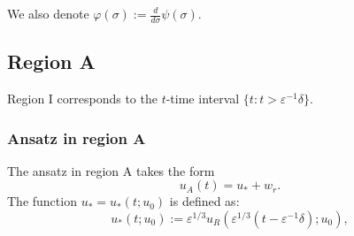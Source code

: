 \documentclass[letterpaper,11pt]{article}
\newcommand{\rmO}{\mathcal{O}}
\newcommand{\eps}{\varepsilon}
\numberwithin{equation}{section}
\theoremstyle{plain}
\begin{document}
We also denote $\varphi(\sigma) := \frac{d}{d\sigma}\psi(\sigma)$.


\iffalse
\begin{equation*}
\varphi(\sigma) =\begin{cases}
 (-\frac{3}{2}\sigma)^{-1/3}, \text{ as }\sigma \to -\infty\\
e^{-\sigma} , \text{ as }\sigma \to \infty.
\end{cases}
\end{equation*}

\begin{equation*}
u_R(\psi(\sigma)) \to \begin{cases}
 -(-\frac{3}{2}\sigma)^{1/3}, \text{ as }\sigma \to -\infty\\
e^{\sigma} , \text{ as }\sigma \to \infty.
\end{cases}
\end{equation*}

\begin{equation*}
2u_R\varphi(\sigma) \to\begin{cases}
-2+ \rmO((-\sigma)^{-3/2}), \text{ as }\sigma \to -\infty\\
2+ \rmO(e^{-2\sigma}), \text{ as }\sigma \to \infty.
\end{cases}
\end{equation*}
%
\fi


\pagebreak



\pagebreak
\subsection{Region A}

Region I corresponds to the $t$-time interval $\{ t : t > \eps^{-1}\delta\}$.

\subsubsection{Ansatz in region A}
The ansatz in region A takes the form
\[
u_{A}(t) = u_* + w_r.
\]
The function $u_* = u_*(t; u_0)$ is defined as:
\begin{equation}\label{urdef}
u_*(t; u_0) := \eps^{1/3}u_R(\eps^{1/3}(t-\eps^{-1}\delta); u_0),
\end{equation}
\end{document}

